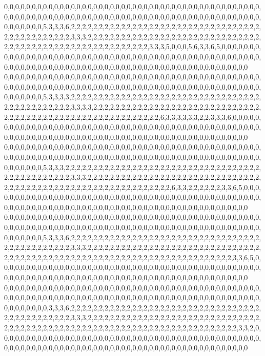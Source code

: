 0,0,0,0,0,0,0,0,0,0,0,0,0,0,0,0,0,0,0,0,0,0,0,0,0,0,0,0,0,0,0,0,0,0,0,0,0,0,0,0,0,0,0,0,0,0,0,0,0,0,0,0,0,0,0,0,0,0,0,0,0,0,0,0,0,0,0,0,0,0,0,0,0,0,0,0,0,0,0,0,0,0,0,0,0,0,0,0,0,0,0,0,0,0,0,0,0,0,0,5,3,3,3,6,2,2,2,2,2,2,2,2,2,2,2,2,2,2,2,2,2,2,2,2,2,2,2,2,2,2,2,2,2,2,2,2,2,2,2,2,2,2,2,2,2,2,2,2,2,2,3,3,3,2,2,2,2,2,2,2,2,2,2,2,2,2,2,2,2,2,2,2,2,2,2,2,2,2,2,2,2,2,2,2,2,2,2,2,2,2,2,2,2,2,2,2,2,2,2,2,2,2,2,2,2,2,2,2,2,2,3,3,3,5,0,0,0,5,6,3,3,6,5,0,0,0,0,0,0,0,0,0,0,0,0,0,0,0,0,0,0,0,0,0,0,0,0,0,0,0,0,0,0,0,0,0,0,0,0,0,0,0,0,0,0,0,0,0,0,0,0,0,0,0,0,0,0,0,0,0,0,0,0,0,0,0,0,0,0,0,0,0,0,0,0,0,0,0,0,0,0,0,0,0,0,0,0,0,0,0,0,0,0,0,0,0,0,0,0,0
0,0,0,0,0,0,0,0,0,0,0,0,0,0,0,0,0,0,0,0,0,0,0,0,0,0,0,0,0,0,0,0,0,0,0,0,0,0,0,0,0,0,0,0,0,0,0,0,0,0,0,0,0,0,0,0,0,0,0,0,0,0,0,0,0,0,0,0,0,0,0,0,0,0,0,0,0,0,0,0,0,0,0,0,0,0,0,0,0,0,0,0,0,0,0,0,0,0,0,5,3,3,3,3,2,2,2,2,2,2,2,2,2,2,2,2,2,2,2,2,2,2,2,2,2,2,2,2,2,2,2,2,2,2,2,2,2,2,2,2,2,2,2,2,2,2,2,2,2,2,3,3,3,3,2,2,2,2,2,2,2,2,2,2,2,2,2,2,2,2,2,2,2,2,2,2,2,2,2,2,2,2,2,2,2,2,2,2,2,2,2,2,2,2,2,2,2,2,2,2,2,2,2,2,2,2,2,2,2,2,2,2,6,3,3,3,3,3,3,2,2,3,3,3,6,0,0,0,0,0,0,0,0,0,0,0,0,0,0,0,0,0,0,0,0,0,0,0,0,0,0,0,0,0,0,0,0,0,0,0,0,0,0,0,0,0,0,0,0,0,0,0,0,0,0,0,0,0,0,0,0,0,0,0,0,0,0,0,0,0,0,0,0,0,0,0,0,0,0,0,0,0,0,0,0,0,0,0,0,0,0,0,0,0,0,0,0,0,0,0
0,0,0,0,0,0,0,0,0,0,0,0,0,0,0,0,0,0,0,0,0,0,0,0,0,0,0,0,0,0,0,0,0,0,0,0,0,0,0,0,0,0,0,0,0,0,0,0,0,0,0,0,0,0,0,0,0,0,0,0,0,0,0,0,0,0,0,0,0,0,0,0,0,0,0,0,0,0,0,0,0,0,0,0,0,0,0,0,0,0,0,0,0,0,0,0,0,0,0,5,3,3,3,2,2,2,2,2,2,2,2,2,2,2,2,2,2,2,2,2,2,2,2,2,2,2,2,2,2,2,2,2,2,2,2,2,2,2,2,2,2,2,2,2,2,2,2,2,2,2,3,3,3,2,2,2,2,2,2,2,2,2,2,2,2,2,2,2,2,2,2,2,2,2,2,2,2,2,2,2,2,2,2,2,2,2,2,2,2,2,2,2,2,2,2,2,2,2,2,2,2,2,2,2,2,2,2,2,2,2,2,2,2,2,6,3,3,2,2,2,2,2,2,3,3,6,5,0,0,0,0,0,0,0,0,0,0,0,0,0,0,0,0,0,0,0,0,0,0,0,0,0,0,0,0,0,0,0,0,0,0,0,0,0,0,0,0,0,0,0,0,0,0,0,0,0,0,0,0,0,0,0,0,0,0,0,0,0,0,0,0,0,0,0,0,0,0,0,0,0,0,0,0,0,0,0,0,0,0,0,0,0,0,0,0,0,0,0,0,0
0,0,0,0,0,0,0,0,0,0,0,0,0,0,0,0,0,0,0,0,0,0,0,0,0,0,0,0,0,0,0,0,0,0,0,0,0,0,0,0,0,0,0,0,0,0,0,0,0,0,0,0,0,0,0,0,0,0,0,0,0,0,0,0,0,0,0,0,0,0,0,0,0,0,0,0,0,0,0,0,0,0,0,0,0,0,0,0,0,0,0,0,0,0,0,0,0,0,0,5,3,3,3,6,2,2,2,2,2,2,2,2,2,2,2,2,2,2,2,2,2,2,2,2,2,2,2,2,2,2,2,2,2,2,2,2,2,2,2,2,2,2,2,2,2,2,2,2,2,2,3,3,3,2,2,2,2,2,2,2,2,2,2,2,2,2,2,2,2,2,2,2,2,2,2,2,2,2,2,2,2,2,2,2,2,2,2,2,2,2,2,2,2,2,2,2,2,2,2,2,2,2,2,2,2,2,2,2,2,2,2,2,2,2,2,2,2,2,2,2,2,2,2,2,2,3,3,6,5,0,0,0,0,0,0,0,0,0,0,0,0,0,0,0,0,0,0,0,0,0,0,0,0,0,0,0,0,0,0,0,0,0,0,0,0,0,0,0,0,0,0,0,0,0,0,0,0,0,0,0,0,0,0,0,0,0,0,0,0,0,0,0,0,0,0,0,0,0,0,0,0,0,0,0,0,0,0,0,0,0,0,0,0,0,0,0,0,0,0,0
0,0,0,0,0,0,0,0,0,0,0,0,0,0,0,0,0,0,0,0,0,0,0,0,0,0,0,0,0,0,0,0,0,0,0,0,0,0,0,0,0,0,0,0,0,0,0,0,0,0,0,0,0,0,0,0,0,0,0,0,0,0,0,0,0,0,0,0,0,0,0,0,0,0,0,0,0,0,0,0,0,0,0,0,0,0,0,0,0,0,0,0,0,0,0,0,0,0,0,0,3,3,3,6,2,2,2,2,2,2,2,2,2,2,2,2,2,2,2,2,2,2,2,2,2,2,2,2,2,2,2,2,2,2,2,2,2,2,2,2,2,2,2,2,2,2,2,2,2,2,3,3,3,2,2,2,2,2,2,2,2,2,2,2,2,2,2,2,2,2,2,2,2,2,2,2,2,2,2,2,2,2,2,2,2,2,2,2,2,2,2,2,2,2,2,2,2,2,2,2,2,2,2,2,2,2,2,2,2,2,2,2,2,2,2,2,2,2,2,2,2,2,2,2,2,2,3,3,2,0,0,0,0,0,0,0,0,0,0,0,0,0,0,0,0,0,0,0,0,0,0,0,0,0,0,0,0,0,0,0,0,0,0,0,0,0,0,0,0,0,0,0,0,0,0,0,0,0,0,0,0,0,0,0,0,0,0,0,0,0,0,0,0,0,0,0,0,0,0,0,0,0,0,0,0,0,0,0,0,0,0,0,0,0,0,0,0,0,0,0

